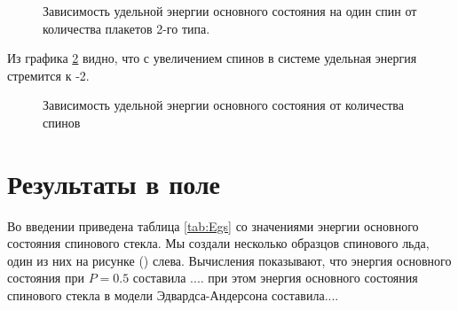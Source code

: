 \documentclass[utf8, babel, sor, jor, amsmath, amssymb, reprint]{elsarticle} %
\begin{document}
\begin{figure}[H]
	\centering
	\caption{Зависимость удельной энергии основного состояния на один спин от количества плакетов 2-го типа.}
	\label{fig:Egs_N_F}
\end{figure}

Из графика \ref{fig:Egs____N_F} видно, что с увеличением спинов в системе удельная энергия стремится к -2.

\begin{figure}[H]
	\centering
	\caption{Зависимость удельной энергии основного состояния от количества спинов}
	\label{fig:Egs____N_F}
\end{figure}

\section{Результаты в поле}

Во введении приведена таблица \ref{tab:Egs} со значениями энергии основного состояния спинового стекла. Мы создали несколько образцов спинового льда, один из них на рисунке (\label{fig:cell_SI_SG}) слева. Вычисления показывают, что энергия основного состояния при $P=0.5$ составила .... при этом энергия основного состояния спинового стекла в модели Эдвардса-Андерсона составила....
\end{document}
